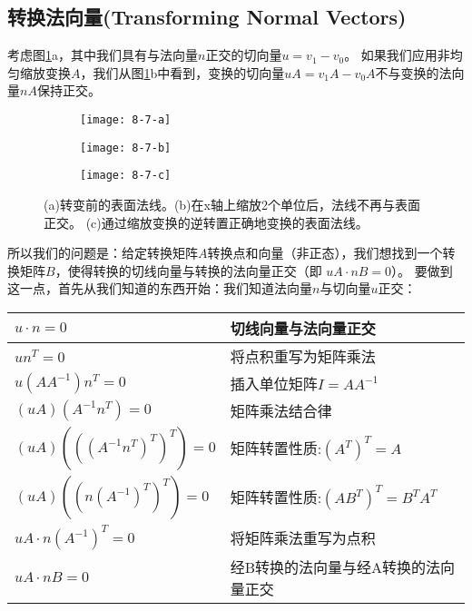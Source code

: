 \subsection{转换法向量(Transforming Normal Vectors)}
\begin{flushleft}
考虑图\ref{fig:8-7}a，其中我们具有与法向量$n$正交的切向量$u=v_{1}-v_{0}$。 如果我们应用非均匀缩放变换$A$，我们从图\ref{fig:8-7}b中看到，变换的切向量$uA=v_{1}A-v_{0}A$不与变换的法向量$nA$保持正交。
\end{flushleft}

\begin{figure}
\begin{subfigure}{.8\textwidth}
  \centering
  \texttt{[image: 8-7-a]}
\end{subfigure}
\begin{subfigure}{.8\textwidth}
  \centering
  \texttt{[image: 8-7-b]}
\end{subfigure}
\begin{subfigure}{.8\textwidth}
  \centering
  \texttt{[image: 8-7-c]}
\end{subfigure}
\caption{(a)转变前的表面法线。(b)在x轴上缩放2个单位后，法线不再与表面正交。 (c)通过缩放变换的逆转置正确地变换的表面法线。}
\label{fig:8-7}
\end{figure}

\begin{flushleft}
所以我们的问题是：给定转换矩阵$A$转换点和向量（非正态），我们想找到一个转换矩阵$B$，使得转换的切线向量与转换的法向量正交（即 $uA\cdot nB = 0$）。 要做到这一点，首先从我们知道的东西开始：我们知道法向量$n$与切向量$u$正交：\\
\end{flushleft}

\begin{tabular}{|p{11em}|p{29em}|} 
\hline
$u\cdot n=0$ & 切线向量与法向量正交\\ 
\hline
$un^{T}=0$ & 将点积重写为矩阵乘法\\ 
\hline
$u(AA^{-1})n^{T}=0$ & 插入单位矩阵$I=AA^{-1}$\\
\hline 
$(uA)(A^{-1}n^{T})=0$ & 矩阵乘法结合律\\
\hline 
$(uA)(((A^{-1}n^{T})^{T})^{T})=0$ & 矩阵转置性质:$(A^{T})^{T}=A$\\
\hline 
$(uA)((n(A^{-1})^{T})^{T})=0$ & 矩阵转置性质:$(AB^{T})^{T}=B^{T}A^{T}$\\
\hline 
$uA\cdot n(A^{-1})^{T}=0$ & 将矩阵乘法重写为点积\\ 
\hline
$uA\cdot nB=0$ & 经B转换的法向量与经A转换的法向量正交\\ 
\hline
\end{tabular}

